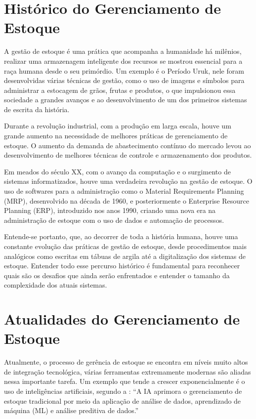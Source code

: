 \documentclass[
	12pt,				%
	openany,			%
	twoside,			%
	a4paper,			%
	english,			%
	brazil				%
	]{abntex2}
\begin{document}
\section{Histórico do Gerenciamento de Estoque}
A gestão de estoque é uma prática que acompanha a humanidade há milênios, realizar uma armazenagem inteligente dos recursos se mostrou essencial para a raça humana desde o seu primórdio. Um exemplo é o Período Uruk, nele foram desenvolvidas várias técnicas de gestão, como o uso de imagens e símbolos para administrar a estocagem de grãos, frutas e produtos, o que impulsionou essa sociedade a grandes avanços e ao desenvolvimento de um dos primeiros sistemas de escrita da história. \cite{Albright1996}

Durante a revolução industrial, com a produção em larga escala, houve um grande aumento na necessidade de melhores práticas de gerenciamento de estoque. O aumento da demanda de abastecimento contínuo do mercado levou ao desenvolvimento de melhores técnicas de controle e armazenamento dos produtos. \cite{DIAS2021}

Em meados do século XX, com o avanço da computação e o surgimento de sistemas informatizados, houve uma verdadeira revolução na gestão de estoque. O uso de softwares para a administração como o Material Requirements Planning (MRP), desenvolvido na década de 1960, e posteriormente o Enterprise Resource Planning (ERP), introduzido nos anos 1990, criando uma nova era na administração de estoque com o uso de dados e automação de processos.

Entende-se portanto, que, ao decorrer de toda a história humana, houve uma constante evolução das práticas de gestão de estoque, desde procedimentos mais analógicos como escritas em tábuas de argila até a digitalização dos sistemas de estoque. Entender todo esse percurso histórico é fundamental para reconhecer quais são os desafios que ainda serão enfrentados e entender o tamanho da complexidade dos atuais sistemas.

\section{Atualidades do Gerenciamento de Estoque}
Atualmente, o processo de gerência de estoque se encontra em níveis muito altos de integração tecnológica, várias ferramentas extremamente modernas são aliadas nessa importante tarefa. Um exemplo que tende a crescer exponencialmente é o uso de inteligências artificiais, segundo a : “A IA aprimora o gerenciamento de estoque tradicional por meio da aplicação de análise de dados, aprendizado de máquina (ML) e análise preditiva de dados.”
\end{document}
